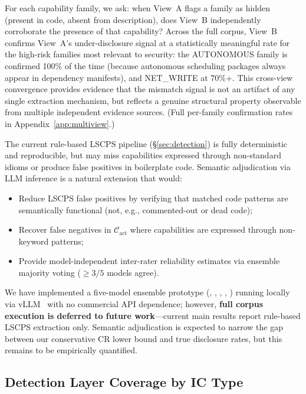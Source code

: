 \noindent
For each capability family, we ask: when View~A flags a family as hidden
(present in code, absent from description), does View~B independently
corroborate the presence of that capability?
Across the full corpus, View~B confirms View~A's under-disclosure signal
at a statistically meaningful rate for the high-risk families most
relevant to security:
the \textsc{AUTONOMOUS} family is confirmed 100\% of the time
(because autonomous scheduling packages always appear in dependency manifests),
and \textsc{NET\_WRITE} at 70\%+.
This cross-view convergence provides evidence that the mismatch signal
is not an artifact of any single extraction mechanism,
but reflects a genuine structural property observable from multiple independent
evidence sources.
(Full per-family confirmation rates in Appendix~\ref{app:multiview}.)


\label{sec:sa}

The current rule-based LSCPS pipeline (\S\ref{sec:detection}) is fully
deterministic and reproducible, but may miss capabilities expressed through
non-standard idioms or produce false positives in boilerplate code.
Semantic adjudication via LLM inference is a natural extension that would:
\begin{itemize}[topsep=2pt,itemsep=1pt]
  \item Reduce LSCPS false positives by verifying that matched code patterns
        are semantically functional (not, e.g., commented-out or dead code);
  \item Recover false negatives in $\mathcal{C}_{\text{act}}$ where capabilities
        are expressed through non-keyword patterns;
  \item Provide model-independent inter-rater reliability estimates
        via ensemble majority voting ($\geq3/5$ models agree).
\end{itemize}

We have implemented a five-model ensemble prototype
(\mone, \mtwo, \mthree, \mfour, \mfive)
running locally via vLLM~\cite{kwon2023vllm} with no commercial API dependence;
however, \textbf{full corpus execution is deferred to future work}---current
main results report rule-based LSCPS extraction only.
Semantic adjudication is expected to narrow the gap between our
conservative CR lower bound and true disclosure rates, but this
remains to be empirically quantified.

\subsection{Detection Layer Coverage by IC Type}

